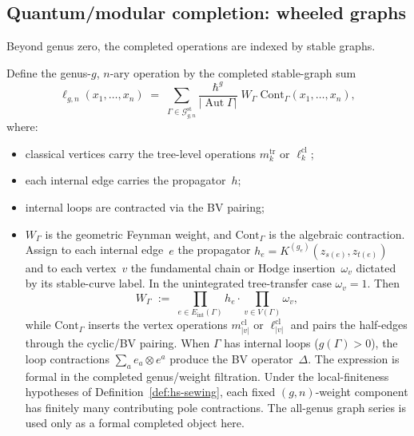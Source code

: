 \subsection{Quantum/modular completion: wheeled graphs}

Beyond genus zero, the completed operations are indexed by stable
graphs.

\begin{definition}
\label{def:genus-refined-linfty}
Define the genus-$g$, $n$-ary operation by the completed stable-graph
sum
\begin{equation}\label{eq:genus-ell}
 \ell_{g,n}(x_1, \dotsc, x_n)
 \;=\;
 \sum_{\Gamma \in \mathcal{G}_{g,n}^{\mathrm{st}}}
 \frac{\hbar^g}{|\operatorname{Aut}\Gamma|}\;
 W_\Gamma\; \mathrm{Cont}_\Gamma(x_1, \dotsc, x_n),
\end{equation}
where:
\begin{itemize}
\item classical vertices carry the tree-level operations
 $m_k^{\mathrm{tr}}$ or $\ell_k^{\mathrm{cl}}$;
\item each internal edge carries the propagator~$h$;
\item internal loops are contracted via the BV pairing;
\item $W_\Gamma$ is the geometric Feynman weight, and
 $\mathrm{Cont}_\Gamma$ is the algebraic contraction.  Assign to each
 internal edge~$e$ the propagator
 $h_e = K^{(g_e)}(z_{s(e)},z_{t(e)})$ and to each vertex~$v$ the
 fundamental chain or Hodge insertion~$\omega_v$ dictated by its
 stable-curve label.  In the unintegrated tree-transfer case
 $\omega_v=1$.  Then
 \[
 W_\Gamma
 \;:=\;
 \prod_{e \in E_{\mathrm{int}}(\Gamma)} h_e
 \cdot
 \prod_{v \in V(\Gamma)} \omega_v,
 \]
 while $\mathrm{Cont}_\Gamma$ inserts the vertex operations
 $m_{|v|}^{\mathrm{cl}}$ or $\ell_{|v|}^{\mathrm{cl}}$ and pairs the
 half-edges through the cyclic/BV pairing.
	 When $\Gamma$ has internal loops ($g(\Gamma) > 0$),
	 the loop contractions $\sum_a e_a \otimes e^a$ produce
	 the BV operator~$\Delta$.  The expression is formal in the
	 completed genus/weight filtration.  Under the local-finiteness
	 hypotheses of Definition~\ref{def:hs-sewing}, each fixed
	 \((g,n)\)-weight component has finitely many contributing pole
	 contractions.  The all-genus graph series is used only as a
	 formal completed object here.
\end{itemize}
\end{definition}

